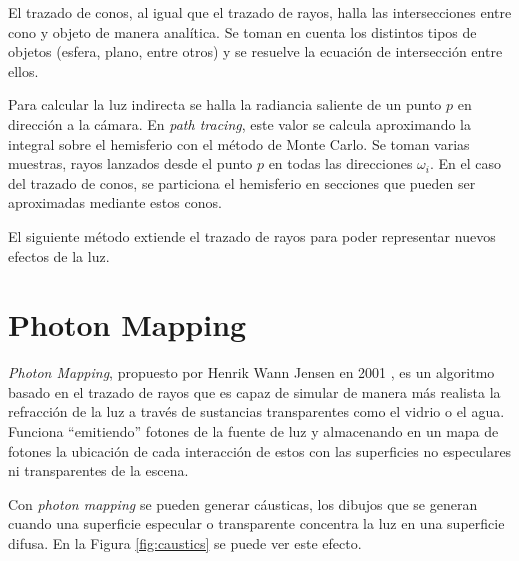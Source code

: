 El trazado de conos, al igual que el trazado de rayos, halla las intersecciones entre cono y objeto de manera analítica.
Se toman en cuenta los distintos tipos de objetos (esfera, plano, entre otros) y se resuelve la ecuación de intersección entre ellos.


Para calcular la luz indirecta se halla la radiancia saliente de un punto $p$ en dirección a la cámara.
En \textit{path tracing}, este valor se calcula aproximando la integral sobre el hemisferio con el método de Monte Carlo.
Se toman varias muestras, rayos lanzados desde el punto $p$ en todas las direcciones $\omega_i$.
En el caso del trazado de conos, se particiona el hemisferio en secciones que pueden ser aproximadas mediante estos conos.

El siguiente método extiende el trazado de rayos para poder representar nuevos efectos de la luz.

\section{Photon Mapping}\label{sec:photon-mapping}

\textit{Photon Mapping}, propuesto por Henrik Wann Jensen en 2001 \cite{photon-mapping}, es un algoritmo basado en el trazado de rayos que es capaz de simular de manera más realista la refracción de la luz a través de sustancias transparentes como el vidrio o el agua. 
Funciona ``emitiendo'' fotones de la fuente de luz y almacenando en un mapa de fotones la ubicación de cada interacción de estos con las superficies no especulares ni transparentes de la escena.

Con \textit{photon mapping} se pueden generar cáusticas, los dibujos que se generan cuando una superficie especular o transparente concentra la luz en una superficie difusa.
En la Figura \ref{fig:caustics} se puede ver este efecto.

